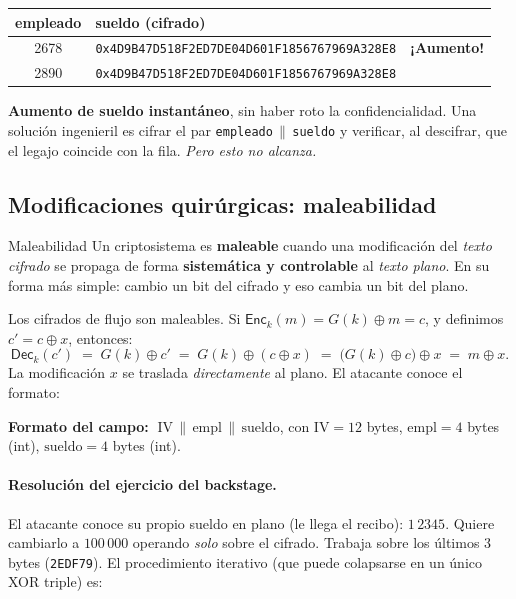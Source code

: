 \documentclass[11pt,a4paper]{article}
\newcommand{\xor}{\oplus}
\newcommand{\concat}{\,\|\,}
\newcommand{\Enc}{\mathsf{Enc}}
\newcommand{\Dec}{\mathsf{Dec}}
\begin{document}
\begin{center}
\renewcommand{\arraystretch}{1.3}
\begin{tabular}{c l c}
\toprule
\textbf{empleado} & \textbf{sueldo (cifrado)} & \\
\midrule
2678 & \textcolor{attackRed}{\texttt{0x4D9B47D518F2ED7DE04D601F1856767969A328E8}}
     & \textcolor{attackRed}{\textbf{¡Aumento!}}\\
2890 & \texttt{0x4D9B47D518F2ED7DE04D601F1856767969A328E8} &\\
\bottomrule
\end{tabular}
\end{center}

\noindent\textbf{Aumento de sueldo instantáneo}, sin haber roto la confidencialidad. Una
solución ingenieril es cifrar el par \texttt{empleado}$\concat$\texttt{sueldo} y verificar, al
descifrar, que el legajo coincide con la fila. \emph{Pero esto no alcanza.}

\subsection{Modificaciones quirúrgicas: maleabilidad}

\begin{defbox}{Maleabilidad}
Un criptosistema es \textbf{maleable} cuando una modificación del \emph{texto cifrado} se
propaga de forma \textbf{sistemática y controlable} al \emph{texto plano}. En su forma más
simple: cambio un bit del cifrado y eso cambia un bit del plano.
\end{defbox}

Los cifrados de flujo son maleables. Si $\Enc_k(m)=G(k)\xor m=c$, y definimos $c'=c\xor x$,
entonces:
\[
  \Dec_k(c') \;=\; G(k)\xor c' \;=\; G(k)\xor(c\xor x)\;=\;\bigl(G(k)\xor c\bigr)\xor x \;=\; m\xor x.
\]
La modificación $x$ se traslada \emph{directamente} al plano. El atacante conoce el formato:

\begin{slidebox}
\textbf{Formato del campo:} $\;\mathrm{IV}\concat \mathrm{empl}\concat \mathrm{sueldo}$,
con $\mathrm{IV}=12$ bytes, $\mathrm{empl}=4$ bytes (int), $\mathrm{sueldo}=4$ bytes (int).
\end{slidebox}

\paragraph{Resolución del ejercicio del backstage.} El atacante conoce su propio sueldo en
plano (le llega el recibo): $1\,2345$. Quiere cambiarlo a $100\,000$ operando \emph{solo}
sobre el cifrado. Trabaja sobre los últimos 3 bytes (\texttt{2EDF79}). El procedimiento
iterativo (que puede colapsarse en un único XOR triple) es:
\end{document}
